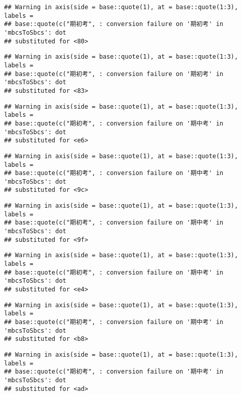 \documentclass[
]{book}
\begin{document}
\begin{verbatim}
## Warning in axis(side = base::quote(1), at = base::quote(1:3), labels =
## base::quote(c("期初考", : conversion failure on '期初考' in 'mbcsToSbcs': dot
## substituted for <80>
\end{verbatim}

\begin{verbatim}
## Warning in axis(side = base::quote(1), at = base::quote(1:3), labels =
## base::quote(c("期初考", : conversion failure on '期初考' in 'mbcsToSbcs': dot
## substituted for <83>
\end{verbatim}

\begin{verbatim}
## Warning in axis(side = base::quote(1), at = base::quote(1:3), labels =
## base::quote(c("期初考", : conversion failure on '期中考' in 'mbcsToSbcs': dot
## substituted for <e6>
\end{verbatim}

\begin{verbatim}
## Warning in axis(side = base::quote(1), at = base::quote(1:3), labels =
## base::quote(c("期初考", : conversion failure on '期中考' in 'mbcsToSbcs': dot
## substituted for <9c>
\end{verbatim}

\begin{verbatim}
## Warning in axis(side = base::quote(1), at = base::quote(1:3), labels =
## base::quote(c("期初考", : conversion failure on '期中考' in 'mbcsToSbcs': dot
## substituted for <9f>
\end{verbatim}

\begin{verbatim}
## Warning in axis(side = base::quote(1), at = base::quote(1:3), labels =
## base::quote(c("期初考", : conversion failure on '期中考' in 'mbcsToSbcs': dot
## substituted for <e4>
\end{verbatim}

\begin{verbatim}
## Warning in axis(side = base::quote(1), at = base::quote(1:3), labels =
## base::quote(c("期初考", : conversion failure on '期中考' in 'mbcsToSbcs': dot
## substituted for <b8>
\end{verbatim}

\begin{verbatim}
## Warning in axis(side = base::quote(1), at = base::quote(1:3), labels =
## base::quote(c("期初考", : conversion failure on '期中考' in 'mbcsToSbcs': dot
## substituted for <ad>
\end{verbatim}
\end{document}
